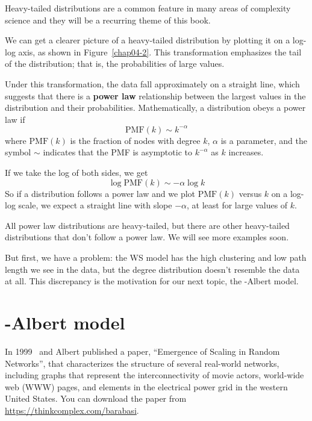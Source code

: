 \documentclass[12pt]{book}
\theoremstyle{exercise}
\begin{document}
Heavy-tailed distributions are a
common feature in many areas of complexity science and they will be a
recurring theme of this book.

We can get a clearer picture of a heavy-tailed distribution by
plotting it on a log-log axis, as shown in Figure~\ref{chap04-2}.
This transformation emphasizes the tail of the distribution; that
is, the probabilities of large values.


\newcommand{\PMF}{\mathrm{PMF}}
\newcommand{\CDF}{\mathrm{CDF}}
\newcommand{\CCDF}{\mathrm{CCDF}}

Under this transformation, the data fall approximately on a
straight line, which suggests that there is a {\bf power law}
relationship between the largest values in the distribution and their
probabilities.  Mathematically, a distribution obeys a power law if
%
\[ \PMF(k) \sim k^{-\alpha} \]
%
where $\PMF(k)$ is the fraction of nodes with degree $k$, $\alpha$
is a parameter, and the symbol $\sim$ indicates that the PMF is
asymptotic to $k^{-\alpha}$ as $k$ increases.

If we take the log of both sides, we get
%
\[ \log \PMF(k) \sim -\alpha \log k \]
%
So if a distribution follows a power law and we plot $\PMF(k)$ versus
$k$ on a log-log scale, we expect a straight line with slope
$-\alpha$, at least for large values of $k$.

All power law distributions are heavy-tailed, but there are other
heavy-tailed distributions that don't follow a power law.  We will
see more examples soon.

But first, we have a problem: the WS model has the high clustering
and low path length we see in the data, but the degree distribution
doesn't resemble the data at all.  This discrepancy is the motivation
for our next topic, the \Barabasi-Albert model.


\section{\Barabasi-Albert model}
\label{scale.free}

In 1999 \Barabasi~and Albert published a paper,
``Emergence of Scaling in Random Networks'', that characterizes the
structure of several real-world networks,
including graphs that represent the interconnectivity of movie actors,
world-wide web (WWW) pages, and elements in the electrical power grid
in the western United States.  You can download the paper from
\url{https://thinkcomplex.com/barabasi}.
\end{document}

